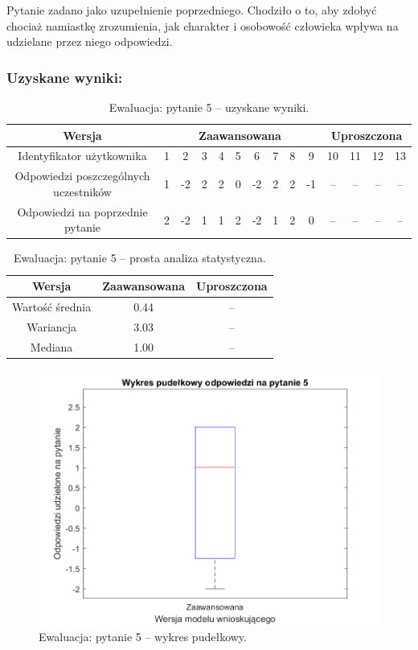 	Pytanie zadano jako uzupełnienie poprzedniego. Chodziło o to, aby zdobyć chociaż namiastkę zrozumienia, jak charakter i osobowość człowieka wpływa na udzielane przez niego odpowiedzi. 
	
	\subsubsection{Uzyskane wyniki:}
	
	\begin{table}[!h]
		\caption{Ewaluacja: pytanie 5 -- uzyskane wyniki.}
		\centering
		\begin{tabular}{|c|c|c|c|c|c|c|c|c|c|c|c|c|c|}
			\hline
			Wersja &  \multicolumn{9}{c|}{Zaawansowana} & \multicolumn{4}{c|}{Uproszczona}\\ \hline
			Identyfikator użytkownika             & 1 & 2 & 3 & 4 & 5 & 6 & 7 & 8 & 9 
			& 10 & 11 & 12 & 13 \\ \hline
			Odpowiedzi poszczególnych uczestników & 1 & -2 & 2 & 2 & 0 & -2 & 2 & 2 & -1
			& --  & -- & -- & --    \\ \hline
			Odpowiedzi na poprzednie pytanie      & 2 & -2 & 1 & 1 & 2 & -2 & 1 & 2 & 0
			& --  & -- & -- & --    \\ \hline
		\end{tabular}
	\end{table}
	
	\begin{table}[!h]
		\caption{Ewaluacja: pytanie 5 -- prosta analiza statystyczna.}
		\centering
		\begin{tabular}{|c|c|c|}
			\hline
			Wersja          & Zaawansowana & Uproszczona \\ \hline
			Wartość średnia & 0.44         & --          \\ \hline
			Wariancja       & 3.03         & --          \\ \hline
			Mediana         & 1.00         & --          \\ \hline
		\end{tabular}
	\end{table}
	
	\begin{figure}[H]
		\centering
		\includegraphics[scale=0.8]{rozdzial5/Ewaluacja5.png}
		\caption{Ewaluacja: pytanie 5 -- wykres pudełkowy.}
	\end{figure}
	
